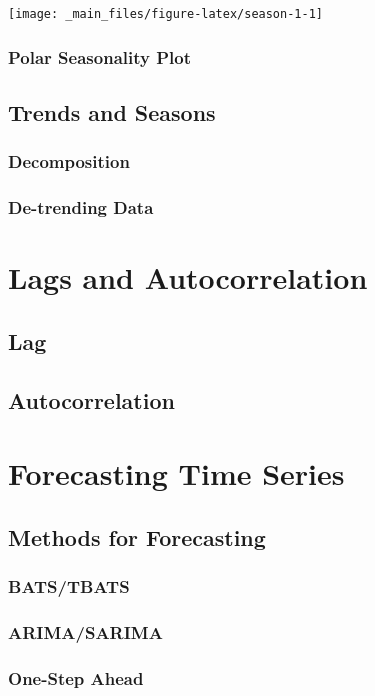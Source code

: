 \documentclass[
]{book}
\begin{document}
\begin{center}\texttt{[image: \_main\_files/figure-latex/season-1-1]} \end{center}

\hypertarget{polar-seasonality-plot}{%
\subsection{Polar Seasonality Plot}\label{polar-seasonality-plot}}

\hypertarget{trends-and-seasons}{%
\section{Trends and Seasons}\label{trends-and-seasons}}

\hypertarget{decomposition}{%
\subsection{Decomposition}\label{decomposition}}

\hypertarget{de-trending-data}{%
\subsection{De-trending Data}\label{de-trending-data}}

\hypertarget{lags-and-autocorrelation}{%
\chapter{Lags and Autocorrelation}\label{lags-and-autocorrelation}}

\hypertarget{lag}{%
\section{Lag}\label{lag}}

\hypertarget{autocorrelation}{%
\section{Autocorrelation}\label{autocorrelation}}

\hypertarget{forecasting-time-series}{%
\chapter{Forecasting Time Series}\label{forecasting-time-series}}

\hypertarget{methods-for-forecasting}{%
\section{Methods for Forecasting}\label{methods-for-forecasting}}

\hypertarget{batstbats}{%
\subsection{BATS/TBATS}\label{batstbats}}

\hypertarget{arimasarima}{%
\subsection{ARIMA/SARIMA}\label{arimasarima}}

\hypertarget{one-step-ahead}{%
\subsection{One-Step Ahead}\label{one-step-ahead}}

  
\end{document}
